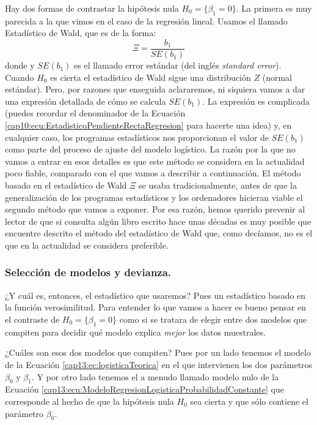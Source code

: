 Hay dos  formas de contrastar la hipótesis nula $H_0=\{\beta_1= 0\}$.  La primera es muy parecida a la que vimos en el caso de la regresión lineal. Usamos el llamado {\sf Estadístico de Wald}, que es de la forma:
\begin{equation}
\label{cap13:ecu:EstadisticoWaldRegresionLogistica}
\Xi = \dfrac{b_1}{SE(b_1)}
\end{equation}
donde y $SE(b_1)$ es el llamado error estándar (del inglés {\em standard error}). Cuando $H_0$ es cierta el estadístico de Wald sigue una distribución $Z$ (normal estándar).  Pero, por razones que enseguida aclararemos, ni siquiera vamos a dar una expresión detallada de cómo se calcula $SE(b_1)$.  La expresión es complicada (puedes recordar el denominador de la Ecuación \ref{cap10:ecu:EstadisticoPendienteRectaRegresion} para hacerte una idea) y, en cualquier caso, los programas estadísticos nos proporcionan el valor de $SE(b_1)$ como parte del proceso de ajuste del modelo logístico.  La razón por la que no vamos a entrar en esos detalles es que este método se considera en la actualidad poco fiable, comparado con el que vamos a describir a continuación. El método basado en el estadístico de Wald $\Xi$ se usaba tradicionalmente, antes de que la generalización de los programas estadísticos y los ordenadores  hicieran viable el segundo método que vamos a exponer. Por esa razón, hemos querido prevenir al lector de que si consulta algún libro escrito hace unas décadas es muy posible que encuentre descrito el método del estadístico de Wald que, como decíamos, no es el que en la actualidad se considera preferible.

\subsubsection{Selección de modelos y devianza.}
\label{cap13:subsubsec:SeleccionModelosDevianza}

¿Y cuál es, entonces, el estadístico que usaremos? Pues un estadístico basado en la función verosimilitud.  Para entender lo que vamos a hacer es bueno pensar en el contraste de $H_0=\{\beta_1= 0\}$ como si se tratara de elegir entre dos modelos que compiten para  decidir qué modelo explica {\em mejor} los datos muestrales.

¿Cuáles son esos dos modelos que compiten? Pues por un lado tenemos el modelo de la Ecuación \ref{cap13:ec:logisticaTeorica} en el que intervienen los dos parámetros $\beta_0$ y $\beta_1$. Y por otro lado tenemos el a menudo llamado {\sf modelo nulo} de la Ecuación \ref{cap13:ecu:ModeloRegresionLogisticaProbabilidadConstante} que corresponde al hecho de que la hipótesis nula $H_0$ sea cierta y que sólo contiene el parámetro $\beta_0$.

